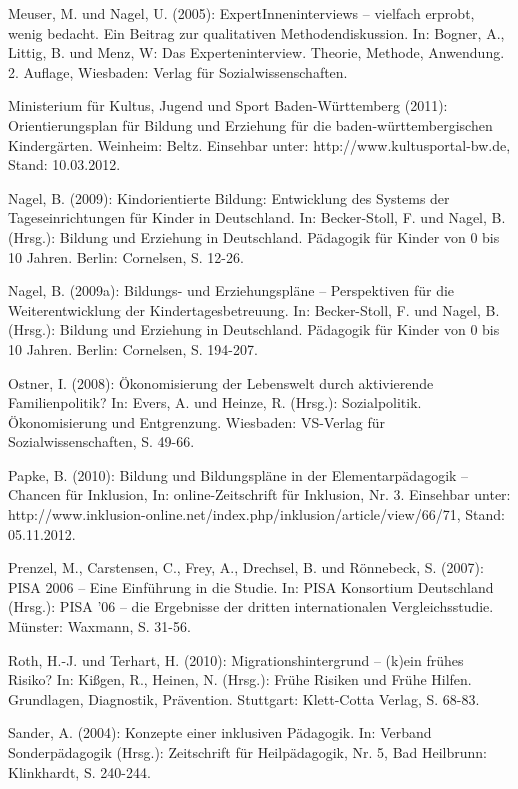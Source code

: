 Meuser, M. und Nagel, U. (2005): ExpertInneninterviews – vielfach erprobt, wenig bedacht. Ein Beitrag zur qualitativen Methodendiskussion. In: Bogner, A., Littig, B. und Menz, W: Das Experteninterview. Theorie, Methode, Anwendung. 2. Auflage, Wiesbaden: Verlag für Sozialwissenschaften.

Ministerium für Kultus, Jugend und Sport Baden-Württemberg (2011): Orientierungsplan für Bildung und Erziehung für die baden-württembergischen Kindergärten. Weinheim: Beltz. Einsehbar unter: http://www.kultusportal-bw.de, Stand: 10.03.2012.

Nagel, B. (2009): Kindorientierte Bildung: Entwicklung des Systems der Tageseinrichtungen für Kinder in Deutschland. In: Becker-Stoll, F. und Nagel, B. (Hrsg.): Bildung und Erziehung in Deutschland. Pädagogik für Kinder von 0 bis 10 Jahren. Berlin: Cornelsen, S. 12-26.

Nagel, B. (2009a): Bildungs- und Erziehungspläne – Perspektiven für die Weiterentwicklung der Kindertagesbetreuung. In: Becker-Stoll, F. und Nagel, B. (Hrsg.): Bildung und Erziehung in Deutschland. Pädagogik für Kinder von 0 bis 10 Jahren. Berlin: Cornelsen, S. 194-207.

Ostner, I. (2008): Ökonomisierung der Lebenswelt durch aktivierende Familienpolitik? In: Evers, A. und Heinze, R. (Hrsg.): Sozialpolitik. Ökonomisierung und Entgrenzung. Wiesbaden: VS-Verlag für Sozialwissenschaften, S. 49-66.

Papke, B. (2010): Bildung und Bildungspläne in der Elementarpädagogik – Chancen für Inklusion, In: online-Zeitschrift für Inklusion, Nr. 3. Einsehbar unter: http://www.inklusion-online.net/index.php/inklusion/article/view/66/71, Stand: 05.11.2012.

Prenzel, M., Carstensen, C., Frey, A., Drechsel, B. und Rönnebeck, S. (2007): PISA 2006 – Eine Einführung in die Studie. In: PISA Konsortium Deutschland (Hrsg.): PISA '06 – die Ergebnisse der dritten internationalen Vergleichsstudie. Münster: Waxmann, S. 31-56.

Roth, H.-J. und Terhart, H. (2010): Migrationshintergrund -- (k)ein frühes Risiko? In: Kißgen, R., Heinen, N. (Hrsg.): Frühe Risiken und Frühe Hilfen. Grundlagen, Diagnostik, Prävention. Stuttgart: Klett-Cotta Verlag, S. 68-83.

	
Sander, A. (2004): Konzepte einer inklusiven Pädagogik. In: Verband Sonderpädagogik (Hrsg.): Zeitschrift für Heilpädagogik, Nr. 5, Bad Heilbrunn: Klinkhardt, S. 240-244.


